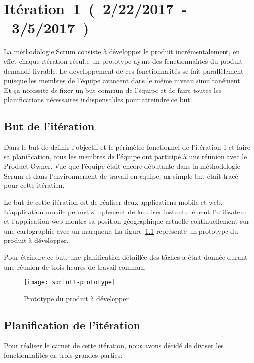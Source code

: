 \chapter{Itération~1~(~2/22/2017~-~3/5/2017~)}

La méthodologie Scrum consiste à développer le produit incrémentalement, en
effet chaque itération résulte un prototype ayant des fonctionnalités du
produit demandé livrable. Le développement de ces fonctionnalités se fait
parallèlement puisque les membres de l'équipe avancent dans le même niveau
simultanément. Et ça nécessite de fixer un but commun de l'équipe et de faire
toutes les planifications nécessaires indispensables pour atteindre ce but.

\section{But de l'itération}

Dans le but de définir l'objectif et le périmètre fonctionnel de l'itération 1
et faire sa planification, tous les membres de l'équipe ont participé à une
réunion avec le Product Owner. Vue que l'équipe était encore débutante dans la
méthodologie Scrum et dans l'environnement de travail en équipe, un simple but
était tracé pour cette itération.

Le but de cette itération est de réaliser deux applications mobile et web.
L'application mobile permet simplement de localiser instantanément
l'utilisateur et l'application web montre sa position géographique actuelle
continuellement sur une cartographie avec un marqueur. La
figure~\ref{fig:sprint1-prototype} représente un prototype du produit à
développer.

Pour éteindre ce but, une planification détaillée des tâches a était donnée
durant une réunion de trois heures de travail commun.

\begin{figure}[H]
    \centering
    \texttt{[image: sprint1-prototype]}
    \caption{Prototype du produit à développer}
\label{fig:sprint1-prototype}
\end{figure}

\section{Planification de l'itération}

Pour réaliser le carnet de cette itération, nous avons décidé de diviser les
fonctionnalités en trois grandes parties:

